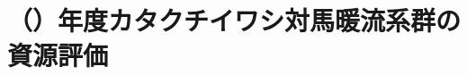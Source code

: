 \chapter{\thisyrjp（\thisyrad）年度カタクチイワシ対馬暖流系群の資源評価}%
%








\clearpage%
%
\setcounter{chapter}{0}

